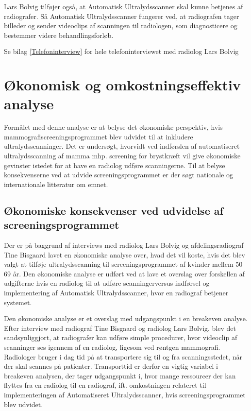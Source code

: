 Lars Bolvig tilføjer også, at Automatisk Ultralydsscanner skal kunne betjenes af radiografer. Så Automatisk Ultralydsscanner fungerer ved, at radiografen tager billeder og sender videoclips af scanningen til radiologen, som diagnosticere og bestemmer videre behandlingsforløb.

Se bilag \ref{Telefoninterview} for hele telefoninterviewet med radiolog Lars Bolvig

\section{Økonomisk og omkostningseffektiv analyse}
Formålet med denne analyse er at belyse det økonomiske perspektiv, hvis mammografiscreeningsprogrammet blev udvidet til at inkludere ultralydsscanninger. Det er undersøgt, hvorvidt ved indførslen af automatiseret ultralydsscanning af mamma mhp. screening for brystkræft vil give økonomiske gevinster istedet for at have en radiolog udføre scanningerne. Til at belyse konsekvenserne ved at udvide screeningsprogrammet er der søgt nationale og internationale litteratur om emnet. 

\subsection{Økonomiske konsekvenser ved udvidelse af screeningsprogrammet} 
Der er på baggrund af interviews med radiolog Lars Bolvig og afdelingsradiograf Tine Bisgaard  lavet en økonomiske analyse over, hvad det vil koste, hvis det blev valgt at tilføje ultralydsscanning til screeningsprogrammet af kvinder mellem 50-69 år. Den økonomiske analyse er udført ved at lave et overslag over forskellen af udgifterne hvis en radiolog til at udføre scanningerversus indførsel og implementering af Automatisk Ultralydsscanner, hvor en radiograf betjener systemet. 

Den økonomiske analyse er et overslag med udgangspunkt i en breakeven analyse. Efter interview med radiograf Tine Bisgaard og radiolog Lars Bolvig, blev det sandsynliggjort, at radiografer kan udføre simple procedurer, hvor videoclip af scanninger ses igennem af en radiolog, ligesom ved røntgen mammografi. Radiologer bruger i dag tid på at transportere sig til og fra scanningsstedet, når der skal scannes på patienter. Transporttid er derfor en vigtig variabel i breakeven analysen, der tager udgangspunkt i, hvor mange ressourcer der kan flyttes fra en radiolog til en radiograf, ift. omkostningen relateret til implementeringen af Automatiseret Ultralydsscanner, hvis screeningsprogrammet blev udvidet. 

